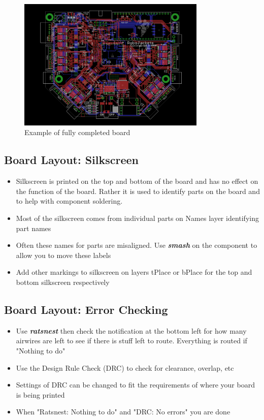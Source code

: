 \documentclass{article}
\begin{document}
\begin{figure}[!h]
    \center
    \includegraphics[width=0.8\textwidth,height=0.6\textheight,keepaspectratio]{control}
    \caption {Example of fully completed board}
    \label{img:control}
\end{figure}

\subsection{Board Layout: Silkscreen}
\begin{itemize}
    \item Silkscreen is printed on the top and bottom of the board and has no effect on the function of the board. Rather it is used to identify parts on the board and to help with component soldering.
    \item Most of the silkscreen comes from individual parts on Names layer identifying part names
    \item Often these names for parts are misaligned. Use
    \textit{\textbf{smash}} on the component to allow you to move these labels
    \item Add other markings to silkscreen on layers tPlace or bPlace for the top and bottom silkscreen respectively
\end{itemize}

\subsection{Board Layout: Error Checking}
\begin{itemize}
    \item Use \textit{\textbf{ratsnest}} then check the notification at the bottom left for how many airwires are left to see if there is stuff left to route. Everything is routed if "Nothing to do"
    \item Use the Design Rule Check (DRC) to check for clearance, overlap, etc
    \item Settings of DRC can be changed to fit the requirements of where your board is being printed
    \item When "Ratsnest: Nothing to do" and "DRC: No errors" you are done
\end{itemize}
\end{document}
